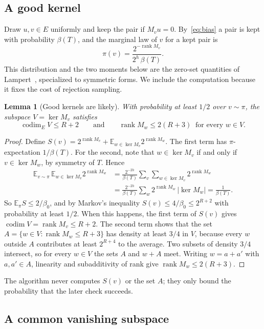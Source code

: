 \documentclass[a4paper,onecolumn,11pt,unpublished]{quantumarticle}
\theoremstyle{plain}
\newtheorem{lemma}[theorem]{Lemma}
\theoremstyle{remark}
\DeclareMathOperator{\rank}{rank}
\DeclareMathOperator{\codim}{codim}
\newcommand{\E}{\mathbb{E}}
\begin{document}
\subsection{A good kernel}

Draw $u,v\in E$ uniformly and keep the pair if $M_vu=0$. By~\eqref{eq:bias} a pair is kept with probability $\beta(T)$, and the marginal law of $v$ for a kept pair is
\[
\pi(v)=\frac{2^{-\rank M_v}}{2^h\,\beta(T)} .
\]
This distribution and the two moments below are the zero-set quantities of Lampert~\cite[Lemmas~2.1--2.2]{Lam25}, specialized to symmetric forms. We include the computation because it fixes the cost of rejection sampling.

\begin{lemma}[Good kernels are likely]\label{lem:kernel}
With probability at least $1/2$ over $v\sim\pi$, the subspace $V=\ker M_v$ satisfies
\[
\codim_EV\le R+2\qquad\text{and}\qquad\rank M_w\le2(R+3)\ \text{ for every } w\in V.
\]
\end{lemma}

\begin{proof}
Define $S(v)=2^{\rank M_v}+\E_{w\in\ker M_v}2^{\rank M_w}$. The first term has $\pi$-expectation $1/\beta(T)$. For the second, note that $w\in\ker M_v$ if and only if $v\in\ker M_w$, by symmetry of $T$. Hence
\begin{align*}
\E_{v\sim\pi}\,\E_{w\in\ker M_v}2^{\rank M_w}
&=\frac{2^{-2h}}{\beta(T)}\sum_v\sum_{w\in\ker M_v}2^{\rank M_w}\\
&=\frac{2^{-2h}}{\beta(T)}\sum_w2^{\rank M_w}\,|\ker M_w|=\frac{1}{\beta(T)} .
\end{align*}
So $\E_\pi S\le2/\beta_0$, and by Markov's inequality $S(v)\le4/\beta_0\le2^{R+2}$ with probability at least $1/2$. When this happens, the first term of $S(v)$ gives $\codim V=\rank M_v\le R+2$. The second term shows that the set $A=\{w\in V:\rank M_w\le R+3\}$ has density at least $3/4$ in $V$, because every $w$ outside $A$ contributes at least $2^{R+4}$ to the average. Two subsets of density $3/4$ intersect, so for every $w\in V$ the sets $A$ and $w+A$ meet. Writing $w=a+a'$ with $a,a'\in A$, linearity and subadditivity of rank give $\rank M_w\le2(R+3)$.
\end{proof}

The algorithm never computes $S(v)$ or the set $A$; they only bound the probability that the later check succeeds.

\subsection{A common vanishing subspace}
\end{document}
